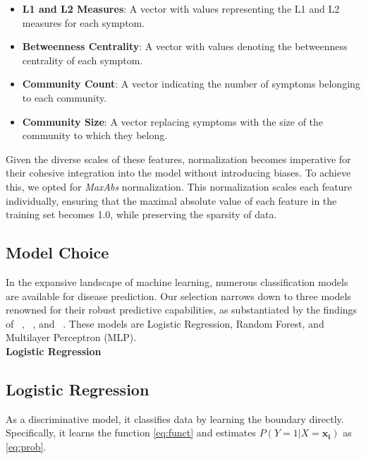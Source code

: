 \begin{itemize}
	\setlength\itemsep{1em} %
	\item \textbf{L1 and L2 Measures}: A vector with values representing the L1 and L2 measures for each symptom.
	\item \textbf{Betweenness Centrality}: A vector with values denoting the betweenness centrality of each symptom.
	\item \textbf{Community Count}: A vector indicating the number of symptoms belonging to each community.
	\item \textbf{Community Size}: A vector replacing symptoms with the size of the community to which they belong.
\end{itemize}
\noindent
Given the diverse scales of these features, normalization becomes imperative for their cohesive integration into the model
without introducing biases. To achieve this, we opted for \textit{MaxAbs} normalization. This normalization scales each feature
individually, ensuring that the maximal absolute value of each feature in the training set becomes 1.0, while preserving the sparsity of data.



\subsection{Model Choice}

In the expansive landscape of machine learning, numerous classification models are available for disease prediction.
Our selection narrows down to three models renowned for their robust predictive capabilities,
as substantiated by the findings of \citeauthor{Kohli}~\cite{Kohli}, \citeauthor{Singh}~\cite{Singh}, and \citeauthor{Uddin2019Dec}~\cite{Uddin2019Dec}.
These models are Logistic Regression, Random Forest, and Multilayer Perceptron (MLP).\\


\noindent
\textbf{Logistic Regression}\vspace{0.15cm}
\subsection{Logistic Regression}
As a discriminative model, it classifies data by learning the boundary directly. Specifically, it learns the function \ref{eq:funct} and estimates 
$P(Y=1|X=\mathbf{x_i})$ as \ref{eq:prob}. 

